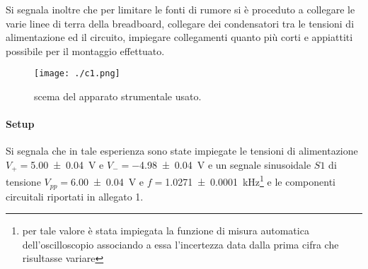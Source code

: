 	Si segnala inoltre che per limitare le fonti di rumore si è proceduto a
	collegare le varie linee di terra della breadboard,
	collegare dei condensatori tra le tensioni di alimentazione ed il circuito,
	impiegare collegamenti quanto più corti e appiattiti possibile per il montaggio effettuato.
	\begin{figure}[ht]
		\centering
		\texttt{[image: ./c1.png]}
		\caption{scema del apparato strumentale usato.}
		\label{f:complessivo}
	\end{figure}
\paragraph{Setup}
	Si segnala che in tale esperienza sono state impiegate le tensioni di alimentazione 
	$V_{+}=$\SI{ 5.00 \pm 0.04}{\volt} e $V_{-}=$\SI{ -4.98 \pm 0.04}{\volt}
	e un segnale sinusoidale $S1$ di tensione $V_{pp}=$\SI{6.00\pm 0.04}{\volt} e $f=$\SI{1.0271 \pm 0.0001}{\kilo \hertz}\footnote{per tale valore è stata impiegata la funzione di misura automatica dell'oscilloscopio associando a essa l'incertezza data dalla prima cifra che risultasse variare} e le componenti circuitali riportati in allegato 1.
